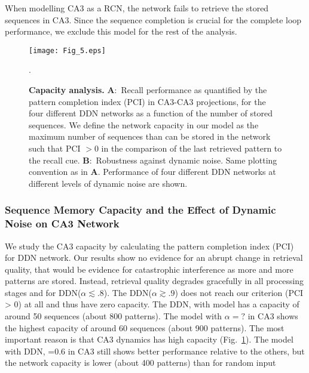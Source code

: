 \documentclass[utf8]{frontiersSCNS} %
\begin{document}
When modelling CA3 as a RCN, the network fails to retrieve the stored sequences in CA3. Since the sequence completion is crucial for the complete loop performance, we exclude this model for the rest of the analysis.


\begin{figure}[!htb]
\centering\texttt{[image: Fig\_5.eps]}
\caption{\textbf{Capacity analysis.} 
\textbf{A}:~Recall performance as quantified by the pattern completion index (PCI) in CA3-CA3 projections, for the four different DDN networks as a function of the number of stored sequences. 
We define the network capacity in our model as the maximum number of sequences than can be stored in the network such that PCI $> 0$ in the comparison of the last retrieved pattern to the recall cue. \textbf{B}:~Robustness against dynamic noise.
Same plotting convention as in \textbf{A}.
Performance of four different DDN networks at different levels of dynamic noise are shown.
}.   
\label{Fig_5}
\end{figure}

\subsubsection{Sequence Memory Capacity and the Effect of Dynamic Noise on CA3 Network}

We study the CA3 capacity by calculating the pattern completion index (PCI) for DDN network. Our results show no evidence for an abrupt change in retrieval quality, that would be evidence for catastrophic interference as more and more patterns are stored. Instead, retrieval quality degrades gracefully in all processing stages and for DDN($\alpha \lesssim .8$).
The DDN($\alpha \gtrsim .9$) does not reach our criterion (PCI > 0) at all and thus have zero capacity. The DDN, with  model has a capacity of around 50 sequences (about 800 patterns). The model with $\alpha = ?$ in CA3 shows the highest capacity of around 60 sequences (about 900 patterns). The most important reason is that CA3 dynamics has high capacity (Fig.~\ref{Fig_5}).  
The model with DDN, =0.6 in CA3 still shows better performance relative to the others, but the network capacity is lower (about 400 patterns) than for random input
\end{document}
